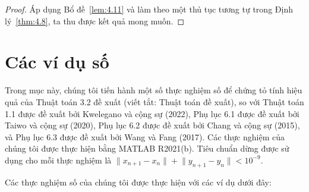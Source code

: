 \documentclass{MyBook}
\theoremstyle{plain}
\theoremstyle{definition}
\theoremstyle{remark}
\numberwithin{equation}{chapter}
\newcommand{\nm}[1]{\lVert #1\rVert}
\begin{document}
\begin{proof}
Áp dụng Bổ đề~\ref{lem:4.11} và làm theo một thủ tục tương tự trong Định lý~\ref{thm:4.8}, ta thu được kết quả mong muốn.
\end{proof}

\chapter{Các ví dụ số}\label{sec:num}

Trong mục này, chúng tôi tiến hành một số thực nghiệm số để chứng tỏ tính hiệu quả của Thuật toán 3.2 đề xuất (viết tắt: Thuật toán đề xuất), so với Thuật toán 1.1 được đề xuất bởi Kwelegano và cộng sự (2022), Phụ lục 6.1 được đề xuất bởi Taiwo và cộng sự (2020), Phụ lục 6.2 được đề xuất bởi Chang và cộng sự (2015), và Phụ lục 6.3 được đề xuất bởi Wang và Fang (2017). Các thực nghiệm của chúng tôi được thực hiện bằng MATLAB R2021(b). Tiêu chuẩn dừng được sử dụng cho mỗi thực nghiệm là $\nm{x_{n+1}-x_n}+\nm{y_{n+1}-y_n}<10^{-9}$.

Các thực nghiệm số của chúng tôi được thực hiện với các ví dụ dưới đây:
\end{document}
